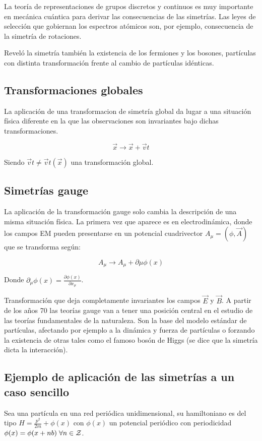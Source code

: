 \documentclass{article}
\begin{document}
La teoría de representaciones de grupos discretos y continuos es muy importante en mecánica cuántica para derivar las consecuencias de las simetrías. Las leyes de selección que gobiernan los espectros atómicos son, por ejemplo, consecuencia de la simetría de rotaciones.

Reveló la simetría también la existencia de los fermiones y los bosones, partículas con distinta transformación frente al cambio de partículas idénticas.

\subsection{Transformaciones globales}
La aplicación de una transformacion de simetría global da lugar a una situación física diferente en la que las observaciones son invariantes bajo dichas transformaciones.

$$\Vec{x}\longrightarrow \Vec{x}+\Vec{v}t$$

Siendo $\Vec{v}t\neq \Vec{v}t(\Vec{x})$ una transformación global.


\subsection{Simetrías gauge}
La aplicación de la transformación gauge solo cambia la descripción de una misma situación física. La primera vez que aparece es en electrodinámica, donde los campos EM pueden presentarse en un potencial cuadrivector $A_\mu=(\phi, \Vec{A})$ que se transforma según:

$$A_\mu \longrightarrow A_\mu +\partial \mu \phi (x)$$

Donde $\partial _\mu \phi (x)=\frac{\partial \phi (x)}{\partial x_\mu}$.

Transformación que deja completamente invariantes los campos $\Vec{E}$ y $\Vec{B}$. A partir de los años 70 las teorías gauge van a tener una posición central en el estudio de las teorías fundamentales de la naturaleza. Son la base del modelo estándar de partículas, afectando por ejemplo a la dinámica y fuerza de partículas o forzando la existencia de otras tales como el famoso bosón de Higgs (se dice que la simetría dicta la interacción).

\newpage
\subsection{Ejemplo de aplicación de las simetrías a un caso sencillo}

Sea una partícula en una red periódica unidimensional, su hamiltoniano es del tipo $H=\frac{p^2}{2m}+\phi (x)$ con $\phi (x)$ un potencial periódico con periodicidad $\phi (x)=\phi (x+nb) \hspace{0.1cm} \forall n\in \mathcal{Z}$.
\end{document}
